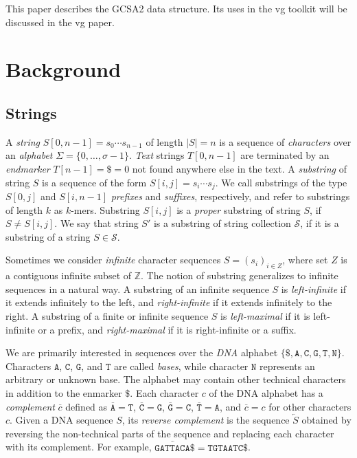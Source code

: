 \documentclass[twoside,leqno,twocolumn]{article}
\newcommand{\set}[1]{\ensuremath{\{ #1 \}}}
\newcommand{\abs}[1]{\ensuremath{\lvert #1 \rvert}}
\newcommand{\baseA}{\mathtt{A}}
\newcommand{\baseC}{\mathtt{C}}
\newcommand{\baseG}{\mathtt{G}}
\newcommand{\baseT}{\mathtt{T}}
\newcommand{\baseN}{\mathtt{N}}
\newcommand{\dnacomp}[1]{\ensuremath{\overline{#1}}}
\newcommand{\revcomp}[1]{\ensuremath{\overleftarrow{#1}}}
\newcommand{\kmer}[1]{$#1$\nobreakdash-mer}
\begin{document}
This paper describes the GCSA2 data structure. Its uses in the vg toolkit will be discussed in the vg paper.


\section{Background}

\subsection{Strings}\label{sect:strings}

A \emph{string} $S[0, n-1] = s_{0} \dotsm s_{n-1}$ of length $\abs{S} = n$ is a sequence of \emph{characters} over an \emph{alphabet} $\Sigma = \set{0, \dotsc, \sigma - 1}$. \emph{Text} strings $T[0, n-1]$ are terminated by an \emph{endmarker} $T[n-1] = \$ = 0$ not found anywhere else in the text. A \emph{substring} of string $S$ is a sequence of the form $S[i, j] = s_{i} \dotsm s_{j}$. We call substrings of the type $S[0, j]$ and $S[i, n-1]$ \emph{prefixes} and \emph{suffixes}, respectively, and refer to substrings of length $k$ as \kmer{k}s. Substring $S[i, j]$ is a \emph{proper} substring of string $S$, if $S \ne S[i, j]$. We say that string $S'$ is a substring of string collection $\mathcal{S}$, if it is a substring of a string $S \in \mathcal{S}$.

Sometimes we consider \emph{infinite} character sequences $S = (s_{i})_{i \in Z}$, where set $Z$ is a contiguous infinite subset of $\mathbb{Z}$. The notion of substring generalizes to infinite sequences in a natural way. A substring of an infinite sequence $S$ is \emph{left-infinite} if it extends infinitely to the left, and \emph{right-infinite} if it extends infinitely to the right. A substring of a finite or infinite sequence $S$ is \emph{left-maximal} if it is left-infinite or a prefix, and \emph{right-maximal} if it is right-infinite or a suffix.

We are primarily interested in sequences over the \emph{DNA} alphabet $\set{\$, \baseA, \baseC, \baseG, \baseT, \baseN}$. Characters $\baseA$, $\baseC$, $\baseG$, and $\baseT$ are called \emph{bases}, while character $\baseN$ represents an arbitrary or unknown base. The alphabet may contain other technical characters in addition to the enmarker $\$$. Each character $c$ of the DNA alphabet has a \emph{complement} $\dnacomp{c}$ defined as $\dnacomp{\baseA} = \baseT$, $\dnacomp{\baseC} = \baseG$, $\dnacomp{\baseG} = \baseC$, $\dnacomp{\baseT} = \baseA$, and $\dnacomp{c} = c$ for other characters $c$. Given a DNA sequence $S$, its \emph{reverse complement} is the sequence $\revcomp{S}$ obtained by reversing the non-technical parts of the sequence and replacing each character with its complement. For example, $\revcomp{\mathtt{GATTACA}\$} = \mathtt{TGTAATC}\$$.
\end{document}
